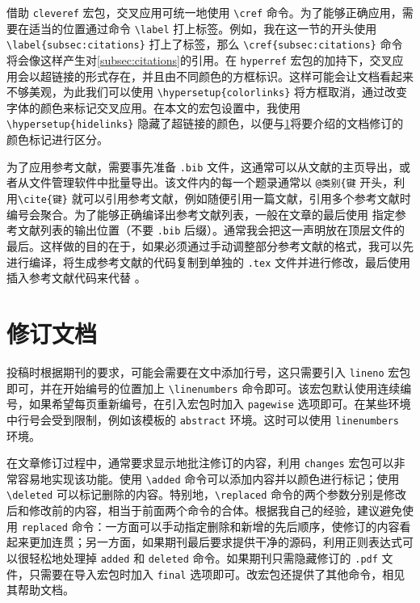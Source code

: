 借助 \verb|cleveref| 宏包，交叉应用可统一地使用 \verb|\cref| 命令。为了能够正确应用，需要在适当的位置通过命令 \verb|\label| 打上标签。例如，我在这一节的开头使用 \verb|\label{subsec:citations}| 打上了标签，那么 \verb|\cref{subsec:citations}| 命令将会像这样产生对\cref{subsec:citations}的引用。在 \verb|hyperref| 宏包的加持下，交叉应用会以超链接的形式存在，并且由不同颜色的方框标识。这样可能会让文档看起来不够美观，为此我们可以使用 \verb|\hypersetup{colorlinks}| 将方框取消，通过改变字体的颜色来标记交叉应用。在本文的宏包设置中，我使用 \verb|\hypersetup{hidelinks}| 隐藏了超链接的颜色，以便与\cref{sec:revision}将要介绍的文档修订的颜色标记进行区分。


为了应用参考文献，需要事先准备 \verb|.bib| 文件，这通常可以从文献的主页导出，或者从文件管理软件中批量导出。该文件内的每一个题录通常以 \verb|@类别{键| 开头，利用\verb|\cite{键}| 就可以引用参考文献，例如随便引用一篇文献\cite{ObservationGravitationalWaves2016}，引用多个参考文献时编号会聚合\cite{ObservationGravitationalWaves2016,SubFemtogFreeFall2016,LISALaserInterferometer1998}。为了能够正确编译出参考文献列表，一般在文章的最后使用 \verb|| 指定参考文献列表的输出位置（不要 \verb|.bib| 后缀）。通常我会把这一声明放在顶层文件的最后。这样做的目的在于，如果必须通过手动调整部分参考文献的格式，我可以先进行编译，将生成参考文献的代码复制到单独的 \verb|.tex| 文件并进行修改，最后使用 \verb|| 插入参考文献代码来代替 \verb||。


\section{修订文档} \label{sec:revision}

投稿时根据期刊的要求，可能会需要在文中添加行号，这只需要引入 \verb|lineno| 宏包即可，并在开始编号的位置加上 \verb|\linenumbers| 命令即可。该宏包默认使用连续编号，如果希望每页重新编号，在引入宏包时加入 \verb|pagewise| 选项即可。在某些环境中行号会受到限制，例如该模板的 \verb|abstract| 环境。这时可以使用 \verb|linenumbers| 环境。


在文章修订过程中，通常要求显示地批注修订的内容，利用 \verb|changes| 宏包可以非常容易地实现该功能。使用 \verb|\added| 命令可以添加内容并以颜色进行标记；使用 \verb|\deleted| 可以标记删除的内容。特别地，\verb|\replaced| 命令的两个参数分别是修改后和修改前的内容，相当于前面两个命令的合体。根据我自己的经验，建议避免使用 \verb|replaced| 命令：一方面可以手动指定删除和新增的先后顺序，使修订的内容看起来更加连贯；另一方面，如果期刊最后要求提供干净的源码，利用正则表达式可以很轻松地处理掉 \verb|added| 和 \verb|deleted| 命令。如果期刊只需隐藏修订的 \verb|.pdf| 文件，只需要在导入宏包时加入 \verb|final| 选项即可。改宏包还提供了其他命令，相见其帮助文档。



